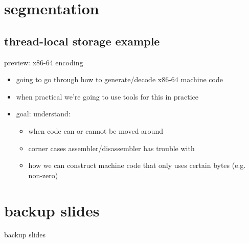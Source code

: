 

\section{segmentation}


\subsection{thread-local storage example}





\begin{frame}{preview: x86-64 encoding}
    \begin{itemize}
    \item going to go through how to generate/decode x86-64 machine code
    \vspace{.5cm}
    \item when practical we're going to use tools for this in practice
    \item goal: understand:
        \begin{itemize}
        \item when code can or cannot be moved around
        \item corner cases assembler/disassembler has trouble with
        \item how we can construct machine code that only uses certain bytes (e.g. non-zero)
        \end{itemize}
    \end{itemize}
\end{frame}





\section{backup slides}
\begin{frame}{backup slides}
\end{frame}


